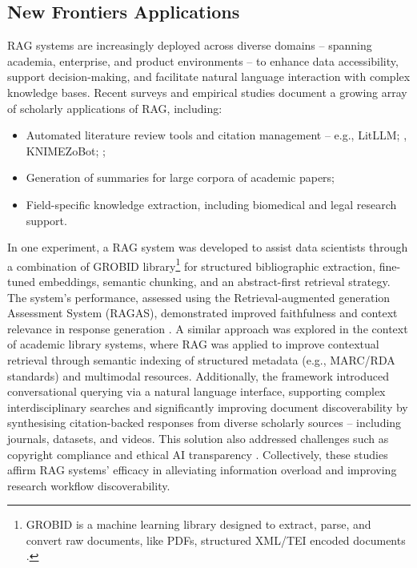\begin{spacing}{1.5}
\section{New Frontiers Applications}\label{sec:evol_qas}
RAG systems are increasingly deployed across diverse domains -- spanning academia, enterprise, and product environments -- to enhance data accessibility, support decision-making, and facilitate natural language interaction with complex knowledge bases. Recent surveys and empirical studies document a growing array of scholarly applications of RAG, including:
\begin{itemize}
    \item Automated literature review tools and citation management -- e.g., LitLLM; \citep{agarwal_litllm_2025}, KNIMEZoBot; \citep{alshammari_knimezobot_2023};
    \item Generation of summaries for large corpora of academic papers;
    \item Field-specific knowledge extraction, including biomedical and legal research support.
\end{itemize}

\noindent In one experiment, a RAG system was developed to assist data scientists through a combination of GROBID library\footnote{GROBID is a machine learning library designed to extract, parse, and convert raw documents, like PDFs, structured XML/TEI encoded documents \citep{GROBID}.} for structured bibliographic extraction, fine-tuned embeddings, semantic chunking, and an abstract-first retrieval strategy. The system's performance, assessed using the Retrieval-augmented generation Assessment System (RAGAS), demonstrated improved faithfulness and context relevance in response generation \citep{aytar_retrieval-augmented_2024}. A similar approach was explored in the context of academic library systems, where RAG was applied to improve contextual retrieval through semantic indexing of structured metadata (e.g., MARC/RDA standards) and multimodal resources. Additionally, the framework introduced conversational querying via a natural language interface, supporting complex interdisciplinary searches and significantly improving document discoverability by synthesising citation-backed responses from diverse scholarly sources -- including journals, datasets, and videos. This solution also addressed challenges such as copyright compliance and ethical AI transparency \citep{bevara_prospects_2025}.  Collectively, these studies affirm RAG systems’ efficacy in alleviating information overload and improving research workflow discoverability.


\end{spacing}
